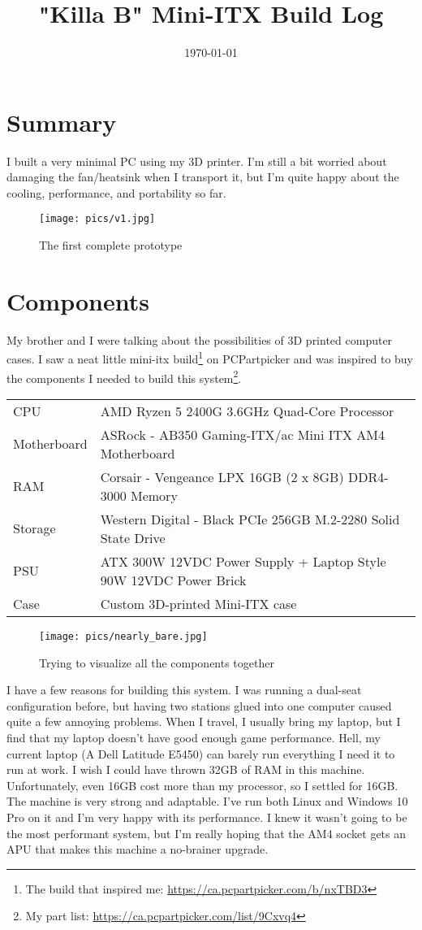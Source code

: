 \documentclass{article}
\title{\textbf{"Killa B" Mini-ITX Build Log}}
\author{}
\date{\today}
\begin{document}
\maketitle

\section{Summary}
I built a very minimal PC using my 3D printer. I'm still a bit worried about damaging the fan/heatsink when I transport it, but I'm quite happy about the cooling, performance, and portability so far.
\begin{figure}[h]
\texttt{[image: pics/v1.jpg]}
\caption{The first complete prototype}
\end{figure}

\section{Components}
My brother and I were talking about the possibilities of 3D printed computer cases. I saw a neat little mini-itx build\footnote{The build that inspired me: \url{https://ca.pcpartpicker.com/b/nxTBD3}} on PCPartpicker and was inspired to buy the components I needed to build this system\footnote{My part list: \url{https://ca.pcpartpicker.com/list/9Cxvq4}}.
\begin{center}
\begin{tabular}{ l l }
 CPU & AMD Ryzen 5 2400G 3.6GHz Quad-Core Processor \\  
 Motherboard & ASRock - AB350 Gaming-ITX/ac Mini ITX AM4 Motherboard \\  
 RAM & Corsair - Vengeance LPX 16GB (2 x 8GB) DDR4-3000 Memory \\
 Storage & Western Digital - Black PCIe 256GB M.2-2280 Solid State Drive \\
 PSU & ATX 300W 12VDC Power Supply + Laptop Style 90W 12VDC Power Brick \\
 Case & Custom 3D-printed  Mini-ITX case \\
\end{tabular}
\end{center}

\begin{figure}[h]
\texttt{[image: pics/nearly\_bare.jpg]}
\caption{Trying to visualize all the components together}
\end{figure}

I have a few reasons for building this system. I was running a dual-seat configuration before, but having two stations glued into one computer caused quite a few annoying problems. When I travel, I usually bring my laptop, but I find that my laptop doesn't have good enough game performance. Hell, my current laptop (A Dell Latitude E5450) can barely run everything I need it to run at work.
I wish I could have thrown 32GB of RAM in this machine. Unfortunately, even 16GB cost more than my processor, so I settled for 16GB. The machine is very strong and adaptable. I've run both Linux and Windows 10 Pro on it and I'm very happy with its  performance. I knew it wasn't going to be the most performant system, but I'm really hoping that the AM4 socket gets an APU that makes this machine a no-brainer upgrade. 
\end{document}
